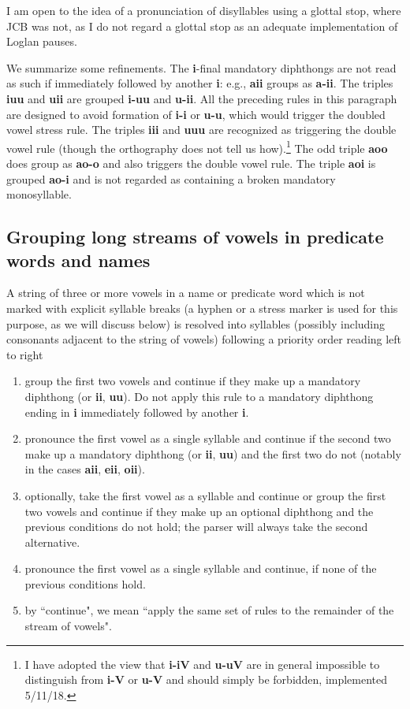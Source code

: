 \documentclass[12pt]{book}
\begin{document}
I am open to the idea of a pronunciation of disyllables using a glottal stop, where JCB was not, as I do not regard a glottal stop as an adequate implementation of Loglan pauses.

We summarize some refinements.  The {\bf i}-final mandatory diphthongs are not read as such if immediately followed by another {\bf i}:  e.g.,
{\bf aii} groups as {\bf a-ii}.  The triples {\bf iuu} and {\bf uii} are grouped {\bf i-uu} and {\bf u-ii}.   All the preceding rules in this paragraph are designed to avoid formation of {\bf i-i} or {\bf u-u}, which would trigger the doubled vowel stress rule. The triples {\bf iii} and {\bf uuu} are recognized
as triggering the double vowel rule (though the orthography does not tell us how).\footnote{I have adopted the view that {\bf i-iV} and {\bf u-uV} are in general impossible to distinguish from  {\bf i-V} or {\bf u-V} and should simply be forbidden, implemented 5/11/18.}   The odd triple {\bf aoo} does group as {\bf ao-o} and also 
triggers the double vowel rule.  The triple {\bf aoi} is grouped {\bf ao-i} and is not regarded as containing a broken mandatory monosyllable.


\subsection{Grouping long streams of vowels in predicate words and names}

A string of three or more vowels  in a name or predicate word which is not marked with explicit syllable breaks (a hyphen or a stress marker is used for this purpose, as we will discuss below) is resolved into syllables (possibly including consonants adjacent to the string of vowels)  following a priority order reading left to right  

\begin{enumerate}

\item group the first two vowels and continue if they make up a mandatory diphthong (or {\bf ii}, {\bf uu}).  Do not apply this rule to a mandatory diphthong ending in {\bf i} immediately followed by another {\bf i}.

\item pronounce the first vowel as a single syllable and continue if the second two make up a mandatory diphthong (or {\bf ii}, {\bf uu})  and the first two do not (notably in the cases {\bf aii}, {\bf eii}, {\bf oii}).

\item optionally, take the first vowel as a syllable and continue or group the first two vowels and continue if they make up an optional diphthong and the previous conditions do
 not hold; the parser will always take the second alternative.

\item  pronounce the first vowel as a single syllable and continue, if none of the previous conditions hold.

\item  by ``continue", we mean ``apply the same set of rules to the remainder of the stream of vowels".

\end{enumerate}
\end{document}
